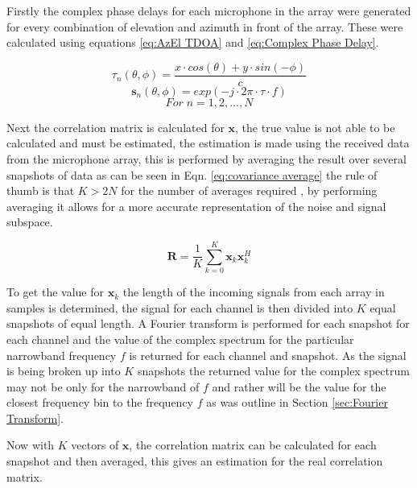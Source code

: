 \documentclass{UoNMCHA}
\numberwithin{equation}{section}
\begin{document}
    Firstly the complex phase delays for each microphone in the array were generated for every combination of elevation and azimuth in front of the array. These were calculated using equations \ref{eq:AzEl TDOA} and \ref{eq:Complex Phase Delay}.
    
    \begin{equation}
        \tau_n(\theta, \phi) = \frac{x \cdot cos(\theta) + y \cdot sin(-\phi)}{c}
        \label{eq:AzEl TDOA}
    \end{equation}
    \begin{equation}
        \mathbf{s}_n(\theta,\phi) = exp(-j \cdot 2\pi \cdot \tau \cdot f)
        \label{eq:Complex Phase Delay}
    \end{equation}
    \begin{equation*}
        For \; n = 1,2,...,N
    \end{equation*}
    
    Next the correlation matrix is calculated for $\mathbf{x}$, the true value is not able to be calculated and must be estimated, the estimation is made using the received data from the microphone array, this is performed by averaging the result over several snapshots of data as can be seen in Eqn. \ref{eq:covariance average} the rule of thumb is that $K > 2N$ for the number of averages required \citep{Adv13}, by performing averaging it allows for a more accurate representation of the noise and signal subspace. 
    
    \begin{equation}
        \mathbf{R} = \frac{1}{K}\sum_{k=0}^K\mathbf{x}_k\mathbf{x}_k^H
        \label{eq:covariance average}
    \end{equation}

    
    To get the value for $\mathbf{x}_k$ the length of the incoming signals from each array in samples is determined, the signal for each channel is then divided into $K$ equal snapshots of equal length. A Fourier transform is performed for each snapshot for each channel and the value of the complex spectrum for the particular narrowband frequency $f$ is returned for each channel and snapshot. As the signal is being broken up into $K$ snapshots the returned value for the complex spectrum may not be only for the narrowband of $f$ and rather will be the value for the closest frequency bin to the frequency $f$ as was outline in Section \ref{sec:Fourier Transform}.
    
    Now with $K$ vectors of $\mathbf{x}$, the correlation matrix can be calculated for each snapshot and then averaged, this gives an estimation for the real correlation matrix.
    
\end{document}
